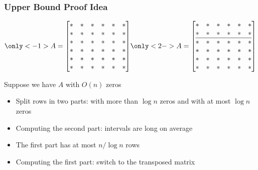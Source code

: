 \documentclass{beamer}
\begin{document}
\begin{frame}
\frametitle{Upper Bound Proof Idea}

\begin{overlayarea}{110mm}{35mm}
\begin{equation*}\only<-1>{A=\left[
\begin{array}{@{}cccccc@{}}
     \ast & \ast  & \ast  & \ast  & \ast  & \ast  \\
     \ast & \ast & \ast  & \ast  & \ast  & \ast  \\
     \ast & \ast & \ast  & \ast  & \ast  & \ast  \\
     \ast & \ast & \ast  & \ast  & \ast  & \ast  \\
     \ast & \ast & \ast  & \ast  & \ast  & \ast  \\
     \ast & \ast & \ast  & \ast  & \ast  & \ast  \\
    \end{array}
    \right]}
\only<2->{
A=\left[
\begin{array}{@{}cccccc@{}}
     \ast & \ast  & \ast  & \ast  & \ast  & \ast  \\
     \ast & \ast & \ast  & \ast  & \ast  & \ast  \\
     \hline
     \ast & \ast & \ast  & \ast  & \ast  & \ast  \\
     \ast & \ast & \ast  & \ast  & \ast  & \ast  \\
     \ast & \ast & \ast  & \ast  & \ast  & \ast  \\
     \ast & \ast & \ast  & \ast  & \ast  & \ast  \\
    \end{array}
    \right]
}
\end{equation*}
\end{overlayarea}

Suppose we have $A$ with $O(n)$ zeros

\pause
\begin{itemize}[<+->]
\item Split rows in two parts: with more than $\log n$ zeros and with at most $\log n$ zeros
\item Computing the second part: intervals are long on average
\item The first part has at most $n/\log n$ rows
\item Computing the first part: switch to the transposed matrix
\end{itemize}


\end{frame}
\end{document}
